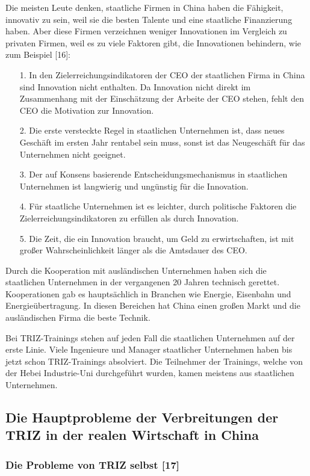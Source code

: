 \documentclass[11pt,a4paper]{article}
\begin{document}
Die meisten Leute denken, staatliche Firmen in China haben die Fähigkeit,
innovativ zu sein, weil sie die besten Talente und eine staatliche
Finanzierung haben. Aber diese Firmen verzeichnen weniger Innovationen im
Vergleich zu privaten Firmen, weil es zu viele Faktoren gibt, die Innovationen
behindern, wie zum Beispiel [16]:
\begin{itemize}
\item[1.] In den Zielerreichungsindikatoren der CEO der staatlichen Firma in
  China sind Innovation nicht enthalten. Da Innovation nicht direkt im
  Zusammenhang mit der Einschätzung der Arbeite der CEO stehen, fehlt den CEO
  die Motivation zur Innovation.
\item[2.] Die erste versteckte Regel in staatlichen Unternehmen ist, dass
  neues Geschäft im ersten Jahr rentabel sein muss, sonst ist das Neugeschäft
  für das Unternehmen nicht geeignet.
\item[3.] Der auf Konsens basierende Entscheidungsmechanismus in staatlichen
  Unternehmen ist langwierig und ungünstig für die Innovation.
\item[4.]  Für staatliche Unternehmen ist es leichter, durch politische
  Faktoren die Zielerreichungsindikatoren zu erfüllen als durch Innovation.
\item[5.] Die Zeit, die ein Innovation braucht, um Geld zu erwirtschaften, ist
  mit großer Wahrscheinlichkeit länger als die Amtsdauer des CEO.
\end{itemize}
Durch die Kooperation mit ausländischen Unternehmen haben sich die staatlichen
Unternehmen in der vergangenen 20 Jahren technisch gerettet.  Kooperationen
gab es hauptsächlich in Branchen wie Energie, Eisenbahn und
Energieübertragung. In diesen Bereichen hat China einen großen Markt und die
ausländischen Firma die beste Technik.

Bei TRIZ-Trainings stehen auf jeden Fall die staatlichen Unternehmen auf der
erste Linie. Viele Ingenieure und Manager staatlicher Unternehmen haben bis
jetzt schon TRIZ-Trainings absolviert. Die Teilnehmer der Trainings, welche
von der Hebei Industrie-Uni durchgeführt wurden, kamen meistens aus
staatlichen Unternehmen.

\subsection{Die Hauptprobleme der Verbreitungen der TRIZ in der realen
  Wirtschaft in China} 

\subsubsection{Die Probleme von TRIZ selbst [17]}
\end{document}
